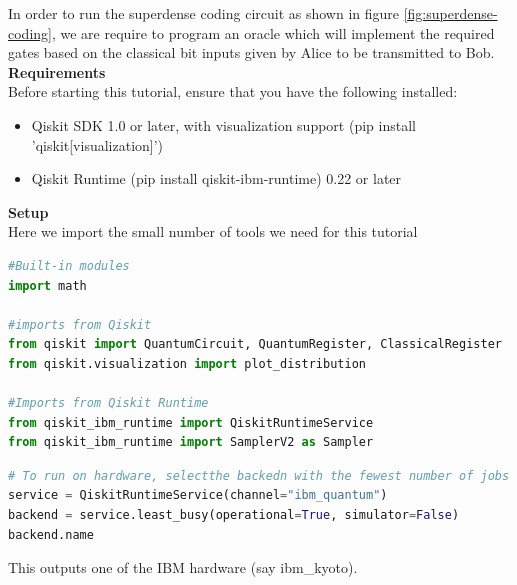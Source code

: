 \documentclass[12pt, oneside]{book}
\theoremstyle{definition}
\theoremstyle{definition}
\theoremstyle{remark}
\begin{document}
In order to run the superdense coding circuit as shown in figure \ref{fig:superdense-coding}, we are require to program an oracle which will implement the required gates based on the classical bit inputs given by Alice to be transmitted to Bob.\\
\textbf{Requirements}\\
Before starting this tutorial, ensure that you have the following installed:
\begin{itemize}
\item Qiskit SDK 1.0 or later, with visualization support (pip install 'qiskit[visualization]')
\item Qiskit Runtime (pip install qiskit-ibm-runtime) 0.22 or later
\end{itemize}
\textbf{Setup}\\
Here we import the small number of tools we need for this tutorial
\begin{lstlisting}[language=Python]
#Built-in modules
import math

#imports from Qiskit
from qiskit import QuantumCircuit, QuantumRegister, ClassicalRegister
from qiskit.visualization import plot_distribution

#Imports from Qiskit Runtime
from qiskit_ibm_runtime import QiskitRuntimeService
from qiskit_ibm_runtime import SamplerV2 as Sampler
\end{lstlisting}
\begin{lstlisting}[language=Python]
# To run on hardware, selectthe backedn with the fewest number of jobs in the queue
service = QiskitRuntimeService(channel="ibm_quantum")
backend = service.least_busy(operational=True, simulator=False)
backend.name
\end{lstlisting}
This outputs one of the IBM hardware (say ibm\_kyoto).
\end{document}
